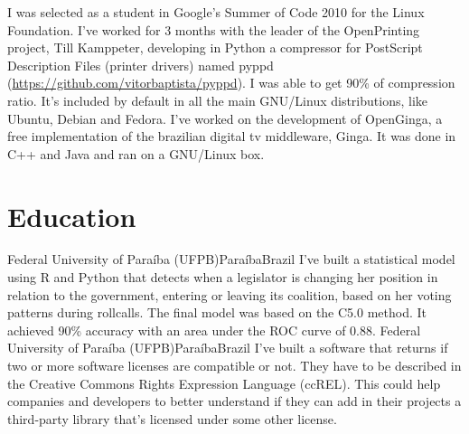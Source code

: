 \documentclass[11pt,a4paper]{moderncv}
\begin{document}
{
  I was selected as a student in Google's Summer of Code 2010 for the Linux Foundation.
  I've worked for 3 months with the leader of the OpenPrinting project, Till Kamppeter,
  developing in Python a compressor for PostScript Description Files (printer
  drivers) named pyppd (\url{https://github.com/vitorbaptista/pyppd}).  I was
  able to get 90\% of compression ratio. It's included by default in all the
  main GNU/Linux distributions, like Ubuntu, Debian and Fedora.
}
{
  I've worked on the development of OpenGinga, a free implementation of the brazilian
  digital tv middleware, Ginga. It was done in C++ and Java and ran on a GNU/Linux box.
}

\section{Education}
{Federal University of Paraíba (UFPB)}{Paraíba}{Brazil}
{
  I've built a statistical model using R and Python that detects when a
  legislator is changing her position in relation to the government, entering
  or leaving its coalition, based on her voting patterns during rollcalls. The
  final model was based on the C5.0 method. It achieved 90\% accuracy with an
  area under the ROC curve of 0.88.
}
{Federal University of Paraíba (UFPB)}{Paraíba}{Brazil}
{
  I've built a software that returns if two or more software licenses are
  compatible or not. They have to be described in the Creative Commons Rights
  Expression Language (ccREL). This could help companies and developers to
  better understand if they can add in their projects a third-party library
  that's licensed under some other license.
}
\end{document}
